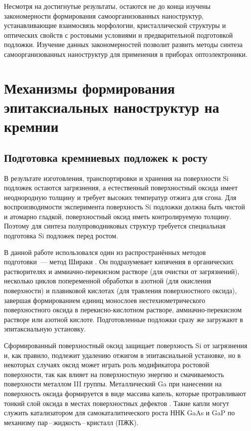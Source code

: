 Несмотря на достигнутые результаты, остаются не до конца изучены закономерности
формирования самоорганизованных наноструктур, устанавливающие взаимосвязь
морфологии, кристаллической структуры и оптических свойств с ростовыми
условиями и предварительной подготовкой подложки. Изучение данных
закономерностей позволит развить методы синтеза самоорганизованных наноструктур
для применения в приборах оптоэлектроники.

\section{Механизмы формирования эпитаксиальных наноструктур на
кремнии}\label{sec:ch1/sec2}

\subsection{Подготовка кремниевых подложек к росту}\label{subsec:ch1/sec2/sub1}

В результате изготовления, транспортировки и хранения на поверхности Si
подложек остаются загрязнения, а естественный поверхностный оксида имеет
неоднородную толщину и требует высоких температур отжига для сгона. Для
воспроизводимости эксперимента поверхность Si подложки должна быть чистой и
атомарно гладкой, поверхностный оксид иметь контролируемую толщину. Поэтому для
синтеза полупроводниковых структур требуется специальная подготовка Si подложек
перед ростом.

В данной работе использовался один из распространённых методов подготовки~---
метод Шираки \cite{Ishizaka2019}. Он подразумевает кипячения в органических
растворителях и аммиачно-перекисном растворе (для очистки от загрязнений),
несколько циклов попеременной обработки в азотной (для окисления поверхности) и
плавиковой кислотах (для травления поверхностного оксида), завершая
формированием единиц монослоев нестехиометрического поверхностного оксида в
перекисно-кислотном растворе, аммиачно-перекисном растворе или азотной кислоте.
Подготовленные подложки сразу же загружают в эпитаксиальную установку.

Сформированный поверхностный оксид защищает поверхность Si от загрязнения и,
как правило, подлежит удалению отжигом в эпитаксиальной установке, но в
некоторых случаях оксид может играть роль модификатора ростовой поверхности,
так как влияет на поверхностную энергию и смачиваемость поверхности металлом
III группы. Металлический Ga при нанесении на поверхность оксида формируется в
виде массива капель, которые протравливают тонкий слой оксида в местах
поверхностных дефектов \cite{fontcuberta2008nucleation}. Такие капли могут
служить катализатором для самокаталитического роста ННК GaAs и GaP по механизму
пар\,--\,жидкость\,--\,кристалл (ПЖК).

